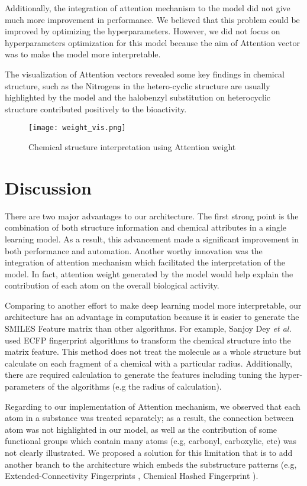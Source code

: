 \documentclass[conference]{IEEEtran}
\begin{document}
{{Additionally, the integration of attention mechanism to the model did not give much more improvement in performance. We believed that this problem could be improved by optimizing the hyperparameters. However, we did not focus on hyperparameters optimization for this model because the aim of Attention vector was to make the model more interpretable.

The visualization of Attention vectors revealed some key findings in chemical structure, such as the Nitrogens in the hetero-cyclic structure are usually highlighted by the model and the halobenzyl substitution on heterocyclic structure contributed positively to the bioactivity.

\begin{figure}[ht]
    \centering
    \texttt{[image: weight\_vis.png]}
    \caption{Chemical structure interpretation using Attention weight}
    \label{fig:weight_vis}
\end{figure}


 
\section{Discussion}
There are two major advantages to our architecture. The first strong point is the combination of both structure information and chemical attributes in a single learning model. As a result, this advancement made a significant improvement in both performance and automation. Another worthy innovation was the integration of attention mechanism which facilitated the interpretation of the model. In fact, attention weight generated by the model would help explain the contribution of each atom on the overall biological activity.

Comparing to another effort to make deep learning model more interpretable, our architecture has an advantage in computation because it is easier to generate the SMILES Feature matrix than other algorithms. For example, Sanjoy Dey \textit{et al.} \cite{Dey2018} used ECFP fingerprint algorithms to transform the chemical structure into the matrix feature. This method does not treat the molecule as a whole structure but calculate on each fragment of a chemical with a particular radius. Additionally, there are required calculation to generate the features including tuning the hyper-parameters of the algorithms (e.g the radius of calculation).

Regarding to our implementation of Attention mechanism, we observed that each atom in a substance was treated separately; as a result, the connection between atom was not highlighted in our model, as well as the contribution of some functional groups which contain many atoms (e.g, carbonyl, carboxylic, etc) was not clearly illustrated. We proposed a solution for this limitation that is to add another branch to the architecture which embeds the substructure patterns (e.g, Extended-Connectivity Fingerprints \cite{Rogers2010}, Chemical Hashed Fingerprint \cite{Al-Lazikani2004}).

}}
\end{document}
